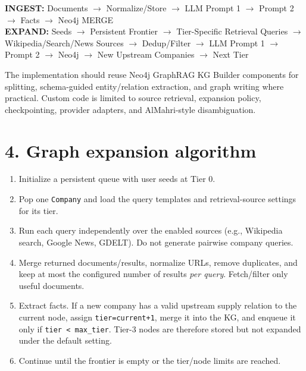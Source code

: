 \documentclass[10pt,a4paper]{article}
\begin{document}
\begin{graybox}
\centering\sffamily\small
\textbf{INGEST:} Documents
$\rightarrow$ Normalize/Store
$\rightarrow$ LLM Prompt 1
$\rightarrow$ Prompt 2
$\rightarrow$ Facts
$\rightarrow$ Neo4j MERGE
\\[1mm]
\textbf{EXPAND:} Seeds
$\rightarrow$ Persistent Frontier
$\rightarrow$ Tier-Specific Retrieval Queries
$\rightarrow$ Wikipedia/Search/News Sources
$\rightarrow$ Dedup/Filter
$\rightarrow$ LLM Prompt 1
$\rightarrow$ Prompt 2
$\rightarrow$ Neo4j
$\rightarrow$ New Upstream Companies
$\rightarrow$ Next Tier
\end{graybox}

The implementation should reuse Neo4j GraphRAG KG Builder components for splitting, schema-guided entity/relation extraction, and graph writing where practical. Custom code is limited to source retrieval, expansion policy, checkpointing, provider adapters, and AlMahri-style disambiguation.

\newpage

\section{4. Graph expansion algorithm}

\begin{enumerate}
\item Initialize a persistent queue with user seeds at Tier 0.
\item Pop one \texttt{Company} and load the query templates and retrieval-source settings for its tier.
\item Run each query independently over the enabled sources (e.g., Wikipedia search, Google News, GDELT). Do not generate pairwise company queries.
\item Merge returned documents/results, normalize URLs, remove duplicates, and keep at most the configured number of results \emph{per query}. Fetch/filter only useful documents.
\item Extract facts. If a new company has a valid upstream supply relation to the current node, assign \texttt{tier=current+1}, merge it into the KG, and enqueue it only if \texttt{tier < max\_tier}. Tier-3 nodes are therefore stored but not expanded under the default setting.
\item Continue until the frontier is empty or the tier/node limits are reached.
\end{enumerate}
\end{document}
